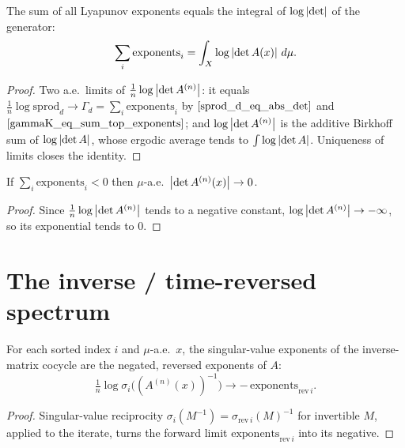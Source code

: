 \begin{theorem}\label{sumAllExp_eq_integral_log_abs_det}
  \leanok
  The sum of all Lyapunov exponents equals the integral of $\log\left\lvert \det \right\rvert$ of the generator:
  \[ \sum_i \mathrm{exponents}_i = \int_X \log\left\lvert \det A(x) \right\rvert\,d\mu. \]
\end{theorem}
\begin{proof}\leanok
  Two a.e.\ limits of $\tfrac1n\log\left\lvert \det A^{(n)} \right\rvert$: it equals $\tfrac1n\log\mathrm{sprod}_d \to \Gamma_d = \sum_i\mathrm{exponents}_i$ by $\ref{sprod_d_eq_abs_det}$ and $\ref{gammaK_eq_sum_top_exponents}$; and $\log\left\lvert \det A^{(n)} \right\rvert$ is the additive Birkhoff sum of $\log\left\lvert \det A \right\rvert$, whose ergodic average tends to $\int\log\left\lvert \det A \right\rvert$. Uniqueness of limits closes the identity.
\end{proof}

\begin{corollary}\label{tendsto_abs_det_cocycle_atTop_zero}
  \leanok
  If $\sum_i \mathrm{exponents}_i < 0$ then $\mu$-a.e.\ $\left\lvert \det A^{(n)}(x) \right\rvert \to 0$.
\end{corollary}
\begin{proof}\leanok
  Since $\tfrac1n\log\left\lvert \det A^{(n)} \right\rvert$ tends to a negative constant, $\log\left\lvert \det A^{(n)} \right\rvert \to -\infty$, so its exponential tends to $0$.
\end{proof}

\section{The inverse / time-reversed spectrum}

\begin{theorem}\label{tendsto_log_singularValue_inv_cocycle}
  \leanok
  For each sorted index $i$ and $\mu$-a.e.\ $x$, the singular-value exponents of the inverse-matrix cocycle are the negated, reversed exponents of $A$:
  \[ \tfrac1n\log\sigma_i\!\big((A^{(n)}(x))^{-1}\big) \to -\,\mathrm{exponents}_{\mathrm{rev}\,i}. \]
\end{theorem}
\begin{proof}\leanok
  Singular-value reciprocity $\sigma_i(M^{-1}) = \sigma_{\mathrm{rev}\,i}(M)^{-1}$ for invertible $M$, applied to the iterate, turns the forward limit $\mathrm{exponents}_{\mathrm{rev}\,i}$ into its negative.
\end{proof}

